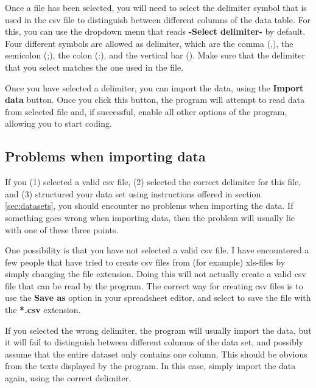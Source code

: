 \documentclass{memoir}
\begin{document}
Once a file has been selected, you will need to select the delimiter symbol that is used in the csv file to distinguish between different columns of the data table. For this, you can use the dropdown menu that reads \textbf{-Select delimiter-} by default. Four different symbols are allowed as delimiter, which are the comma (,), the semicolon (;), the colon (:), and the vertical bar (\textbar). Make sure that the delimiter that you select matches the one used in the file.

Once you have selected a delimiter, you can import the data, using the \textbf{Import data} button. Once you click this button, the program will attempt to read data from selected file and, if successful, enable all other options of the program, allowing you to start coding.   


\subsection{Problems when importing data}
\label{sec:importerrors}

If you (1) selected a valid csv file, (2) selected the correct delimiter for this file, and (3) structured your data set using instructions offered in section \ref{sec:datasets}, you should encounter no problems when importing the data. If something goes wrong when importing data, then the problem will usually lie with one of these three points.

One possibility is that you have not selected a valid csv file. I have encountered a few people that have tried to create csv files from (for example) xls-files by simply changing the file extension. Doing this will not actually create a valid csv file that can be read by the program. The correct way for creating csv files is to use the \textbf{Save as} option in your spreadsheet editor, and select to save the file with the \textbf{*.csv} extension.

If you selected the wrong delimiter, the program will usually import the data, but it will fail to distinguish between different columns of the data set, and possibly assume that the entire dataset only contains one column. This should be obvious from the texts displayed by the program. In this case, simply import the data again, using the correct delimiter. 
\end{document}
